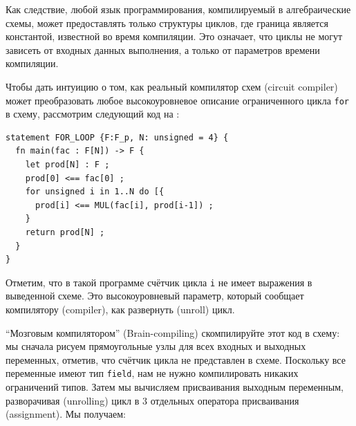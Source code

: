 Как следствие, любой язык программирования, компилируемый в алгебраические схемы, может предоставлять только структуры циклов, где граница является константой, известной во время компиляции. Это означает, что циклы не могут зависеть от входных данных выполнения, а только от параметров времени компиляции.
\begin{example} Чтобы дать интуицию о том, как реальный компилятор схем (circuit compiler) может преобразовать любое высокоуровневое описание ограниченного цикла \texttt{for} в схему, рассмотрим следующий код на :
\begin{lstlisting}
statement FOR_LOOP {F:F_p, N: unsigned = 4} {
  fn main(fac : F[N]) -> F {
  	let prod[N] : F ;
  	prod[0] <== fac[0] ;
    for unsigned i in 1..N do [{
      prod[i] <== MUL(fac[i], prod[i-1]) ; 
    }
    return prod[N] ;
  }
}
\end{lstlisting}
Отметим, что в такой программе счётчик цикла \texttt{i} не имеет выражения в выведенной схеме. Это высокоуровневый параметр, который сообщает компилятору (compiler), как развернуть (unroll) цикл.

``Мозговым компилятором'' (Brain-compiling) скомпилируйте этот код в схему: мы сначала рисуем прямоугольные узлы для всех входных и выходных переменных, отметив, что счётчик цикла не представлен в схеме. Поскольку все переменные имеют тип \texttt{field}, нам не нужно компилировать никаких ограничений типов. Затем мы вычисляем присваивания выходным переменным, разворачивая (unrolling) цикл в $3$ отдельных оператора присваивания (assignment). Мы получаем:
\begin{center}
\end{center}
\end{example}
